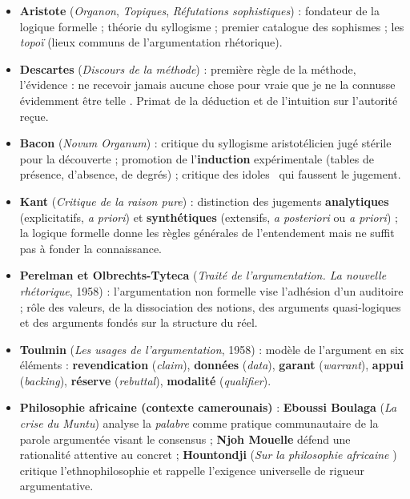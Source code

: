 \documentclass[11pt]{article}
\begin{document}
\begin{itemize}
  \item \textbf{Aristote} (\emph{Organon}, \emph{Topiques}, \emph{Réfutations sophistiques}) : fondateur de la logique formelle ; théorie du syllogisme ; premier catalogue des sophismes ; les \emph{topoï} (lieux communs de l'argumentation rhétorique).
  \item \textbf{Descartes} (\emph{Discours de la méthode}) : première règle de la méthode, l'évidence : \guillemotleft ne recevoir jamais aucune chose pour vraie que je ne la connusse évidemment être telle \guillemotright. Primat de la déduction et de l'intuition sur l'autorité reçue.
  \item \textbf{Bacon} (\emph{Novum Organum}) : critique du syllogisme aristotélicien jugé stérile pour la découverte ; promotion de l'\textbf{induction} expérimentale (tables de présence, d'absence, de degrés) ; critique des \guillemotleft idoles \guillemotright\ qui faussent le jugement.
  \item \textbf{Kant} (\emph{Critique de la raison pure}) : distinction des jugements \textbf{analytiques} (explicitatifs, \emph{a priori}) et \textbf{synthétiques} (extensifs, \emph{a posteriori} ou \emph{a priori}) ; la logique formelle donne les règles générales de l'entendement mais ne suffit pas à fonder la connaissance.
  \item \textbf{Perelman et Olbrechts-Tyteca} (\emph{Traité de l'argumentation. La nouvelle rhétorique}, 1958) : l'argumentation non formelle vise l'adhésion d'un auditoire ; rôle des valeurs, de la dissociation des notions, des arguments quasi-logiques et des arguments fondés sur la structure du réel.
  \item \textbf{Toulmin} (\emph{Les usages de l'argumentation}, 1958) : modèle de l'argument en six éléments : \textbf{revendication} (\emph{claim}), \textbf{données} (\emph{data}), \textbf{garant} (\emph{warrant}), \textbf{appui} (\emph{backing}), \textbf{réserve} (\emph{rebuttal}), \textbf{modalité} (\emph{qualifier}).
  \item \textbf{Philosophie africaine (contexte camerounais)} : \textbf{Eboussi Boulaga} (\emph{La crise du Muntu}) analyse la \emph{palabre} comme pratique communautaire de la parole argumentée visant le consensus ; \textbf{Njoh Mouelle} défend une rationalité attentive au concret ; \textbf{Hountondji} (\emph{Sur la \guillemotleft philosophie africaine \guillemotright}) critique l'ethnophilosophie et rappelle l'exigence universelle de rigueur argumentative.
\end{itemize}
\end{document}
